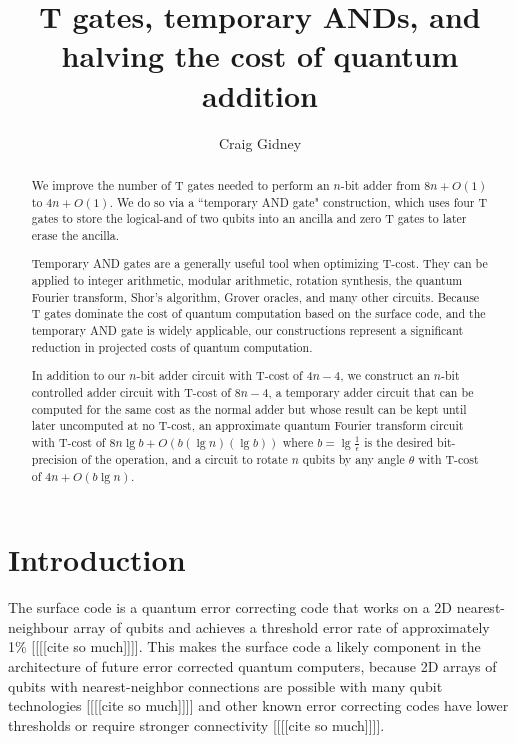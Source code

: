 \documentclass[twocolumn,longbibliography]{quantumarticle-customized}
\title{T gates, temporary ANDs, and halving the cost of quantum addition}
\author{Craig Gidney}
\affiliation{Google, Santa Barbara, CA 93117, USA}
\begin{document}
\maketitle

\begin{abstract}
We improve the number of T gates needed to perform an $n$-bit adder from $8n + O(1)$ \cite{Amy2013, AustinDiscussionsAndEmails2017} to $4n + O(1)$.
We do so via a ``temporary AND gate" construction, which uses four T gates to store the logical-and of two qubits into an ancilla and zero T gates to later erase the ancilla.

Temporary AND gates are a generally useful tool when optimizing T-cost.
They can be applied to integer arithmetic, modular arithmetic, rotation synthesis, the quantum Fourier transform, Shor's algorithm, Grover oracles, and many other circuits.
Because T gates dominate the cost of quantum computation based on the surface code, and the temporary AND gate is widely applicable, our constructions represent a significant reduction in projected costs of quantum computation.

In addition to our $n$-bit adder circuit with T-cost of $4n-4$, we construct an $n$-bit controlled adder circuit with T-cost of $8n-4$, a temporary adder circuit that can be computed for the same cost as the normal adder but whose result can be kept until later uncomputed at no T-cost, an approximate quantum Fourier transform circuit with T-cost of $8 n \lg b + O(b (\lg n) (\lg b))$ where $b = \lg \frac{1}{\epsilon}$ is the desired bit-precision of the operation, and a circuit to rotate $n$ qubits by any angle $\theta$ with T-cost of $4n + O(b \lg n)$.
\end{abstract}


\section{Introduction}
\label{sec:introduction}

The surface code is a quantum error correcting code that works on a 2D nearest-neighbour array of qubits and achieves a threshold error rate of approximately 1\% [[[[cite so much]]]].
This makes the surface code a likely component in the architecture of future error corrected quantum computers, because 2D arrays of qubits with nearest-neighbor connections are possible with many qubit technologies [[[[cite so much]]]] and other known error correcting codes have lower thresholds or require stronger connectivity [[[[cite so much]]]].
\end{document}
